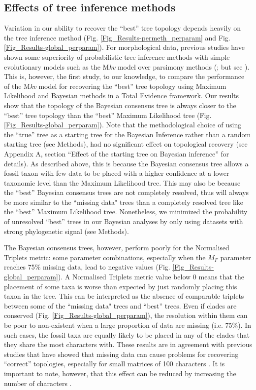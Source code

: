 \subsection{Effects of tree inference methods}
Variation in our ability to recover the ``best'' tree topology depends heavily on the tree inference method (Fig. \ref{Fig_Results-permeth_perparam} and Fig. \ref{Fig_Results-global_perparam}).
For morphological data, previous studies have shown some superiority of probabilistic tree inference methods with simple evolutionary models such as the M\textit{kv} model \citep{lewisa2001} over parsimony methods (\citealp{wrightbayesian2014}; but see \citealp{spencerefficacy2013}).
This is, however, the first study, to our knowledge, to compare the performance of the M\textit{kv} model \citep{lewisa2001} for recovering the ``best'' tree topology using Maximum Likelihood and Bayesian methods in a Total Evidence framework.
Our results show that the topology of the Bayesian consensus tree is always closer to the ``best'' tree topology than the ``best'' Maximum Likelihood tree (Fig. \ref{Fig_Results-global_perparam}).
Note that the methodological choice of using the ``true'' tree as a starting tree for the Bayesian Inference rather than a random starting tree (see Methods), had no significant effect on topological recovery (see Appendix A, section ``Effect of the starting tree on Bayesian inference'' for details).
%
%
As described above, this is because the Bayesian consensus tree allows a fossil taxon with few data to be placed with a higher confidence at a lower taxonomic level than the Maximum Likelihood tree.
This may also be because the ``best'' Bayesian consensus trees are not completely resolved, thus will always be more similar to the ``missing data" trees than a completely resolved tree like the ``best'' Maximum Likelihood tree.
Nonetheless, we minimized the probability of unresolved ``best'' trees in our Bayesian analyses by only using datasets with strong phylogenetic signal (see Methods).

The Bayesian consensus trees, however, perform poorly for the Normalised Triplets metric: some parameter combinations, especially when the $M_F$ parameter reaches 75\% missing data, lead to negative values (Fig. \ref{Fig_Results-global_perparam}).
A Normalised Triplets metric value below 0 means that the placement of some taxa is worse than expected by just randomly placing this taxon in the tree.
This can be interpreted as the absence of comparable triplets between some of the ``missing data" trees and ``best'' trees.
Even if clades are conserved (Fig. \ref{Fig_Results-global_perparam}), the resolution within them can be poor to non-existent when a large proportion of data are missing (i.e. 75\%).
In such cases, the fossil taxa are equally likely to be placed in any of the clades that they share the most characters with.
These results are in agreement with previous studies that have showed that missing data can cause problems for recovering ``correct'' topologies, especially for small matrices of 100 characters \citep{wiensmissing2003}.
It is important to note, however, that this effect can be reduced by increasing the number of characters \citep{wiensmissing2003}.

